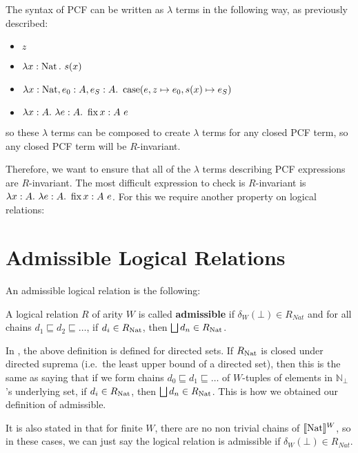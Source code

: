 The syntax of PCF can be written as $\lambda$ terms in the following way, as previously described:

\begin{itemize}
\item{$z$}
\item{$\lambda x: \nat. \ s(x)$}
\item{$\lambda x: \operatorname{Nat}, e_0 : A, e_S: A. \ \operatorname{case}(e,z \mapsto e_0,s(x) \mapsto e_S)$}
\item{$\lambda x : A. \ \lambda e: A . \ \fix x:A \ e $}
\end{itemize} 


so these $\lambda$ terms can be composed to create $\lambda$ terms for any closed PCF term, so any closed PCF term will be $R$-invariant.

Therefore, we want to ensure that all of the $\lambda$ terms describing PCF expressions are $R$-invariant. The most difficult expression to check is $R$-invariant is $\lambda x:A. \ \lambda e: A . \ \fix x:A \ e $. For this we require another property on logical relations:

\section{Admissible Logical Relations}

An admissible logical relation is the following:

\vspace{0.5cm}

\begin{defn}{\citep{Streicher06}}
A logical relation $R$ of arity $W$ is called \textbf{admissible} if $\delta_W(\bot) \in R_{Nat}$ and for all chains $d_1 \sqsubseteq d_2 \sqsubseteq \dots$, if  $d_i \in R_{\operatorname{Nat}}$, then $\bigsqcup d_n \in R_{\operatorname{Nat}}$.
\end{defn}

In \citep{Streicher06}, the above definition is defined for directed sets. If $R_{\operatorname{Nat}}$ is closed under directed suprema (i.e.\ the least upper bound of a directed set), then this is the same as saying that if we form chains $d_0 \sqsubseteq d_1 \sqsubseteq \dots$ of $W$-tuples of elements in $\mathbb{N}_\bot$'s underlying set, if $d_i \in R_{\operatorname{Nat}}$, then $\bigsqcup d_n \in R_{\operatorname{Nat}}$. This is how we obtained our definition of admissible.

It is also stated in \citep{Streicher06} that for finite $W$, there are no non trivial chains of $\llbracket \operatorname{Nat} \rrbracket^W$, so in these cases, we can just say the logical relation is admissible if $\delta_W(\bot) \in R_{Nat}$.  


